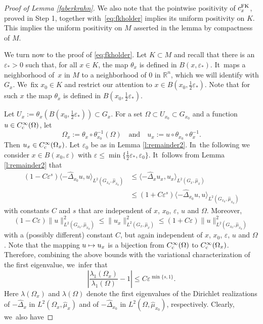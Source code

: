 \documentclass[10pt]{amsart}
\newcommand\mto{\mathchoice{\longmapsto}{\mapsto}{\mapsto}{\mapsto}}
\newcommand{\rc}{\textup{c}}
\newcommand{\FK}{\textup{FK}}
\theoremstyle{definition}
\let\epsilon\varepsilon
\newcommand{\1}{\mathbbm{1}}
\newcommand{\R}{\mathbb{R}}
\begin{document}
\begin{proof}[Proof of Lemma \ref{faberkrahn}]
We also note that the pointwise positivity of $c^\FK_x$, proved in Step 1, together with~\eqref{eq:fkholder} implies its uniform positivity on $K$. This implies the uniform positivity on $M$ asserted in the lemma by compactness of $M$.

We turn now to the proof of \eqref{eq:fkholder}. Let $K\subset M$ and recall that there is an $\epsilon_*>0$ such that, for all $x\in K$, the map $\theta_x$ is defined in $B(x,\epsilon_*)$. It~maps a neighborhood of~$x$ in $M$ to a neighborhood of $0$ in $\R^n$, which we will identify with $G_x$. We~fix $x_0\in K$ and restrict our attention to $x\in B(x_0,\frac12\epsilon_*)$. Note that for such $x$ the map $\theta_x$ is defined in $B(x_0,\frac12\epsilon_*)$.

Let $U_x :=\theta_{x}(B(x_0,\frac12\epsilon_*))\subset G_x$. For a set $\Omega\subset U_{x_0}\subset G_{x_0}$ and a function $u\in C^\infty_\rc(\Omega)$, let
\[
\Omega_x:= \theta_x\circ \theta_{x_0}^{-1}(\Omega)
\quad\text{and}\quad
u_x := u \circ \theta_{x_0} \circ \theta_x^{-1}.
\]
Then $u_x\in C^\infty_\rc(\Omega_x)$. Let $\epsilon_0$ be as in Lemma \ref{l:remainder2}. In~the following we consider $x\in B(x_0,\epsilon)$ with $\epsilon\leq\min\{\frac12\epsilon_*,\epsilon_0\}$. It~follows from Lemma \ref{l:remainder2} that
\begin{align*}
(1-C \epsilon^s) \langle -\widehat\Delta_{x_0} u, u \rangle_{L^2(G_{x_0},\widehat\mu_{x_0})} & \leq
\langle -\widehat\Delta_{x} u_x, u_x \rangle_{L^2(G_{x},\widehat\mu_{x})} \\
& \leq (1+C \epsilon^s) \langle -\widehat\Delta_{x_0} u, u \rangle_{L^2(G_{x_0},\widehat\mu_{x_0})}
\end{align*}
with constants $C$ and $s$ that are independent of $x$, $x_0$, $\epsilon$, $u$ and $\Omega$. Moreover,
\[
(1-C \epsilon) \| u \|_{L^2(G_{x_0},\widehat\mu_{x_0})}^2 \leq
\| u_x \|_{L^2(G_{x},\widehat\mu_{x})}^2
\leq (1+C \epsilon) \| u \|_{L^2(G_{x_0},\widehat\mu_{x_0})}^2
\]
with a (possibly different) constant $C$, but again independent of $x$, $x_0$, $\epsilon$, $u$ and $\Omega$. Note that the mapping $u\mto u_x$ is a bijection from $C^\infty_\rc(\Omega)$ to $C^\infty_\rc(\Omega_x)$. Therefore, combining the above bounds with the variational characterization of the first eigenvalue, we~infer that
\begin{equation}
\label{eq:fkcontproof1}
\left| \frac{\lambda_1(\Omega_x)}{\lambda_1(\Omega)} - 1\right| \leq C \epsilon^{\min\{s,1\}}.
\end{equation}
Here $\lambda(\Omega_x)$ and $\lambda(\Omega)$ denote the first eigenvalues of the Dirichlet realizations of $-\widehat\Delta_x$ in $L^2(\Omega_x,\widehat\mu_x)$ and of $-\widehat\Delta_{x_0}$ in $L^2(\Omega,\widehat\mu_{x_0})$, respectively. Clearly, we~also have

\end{proof}
\end{document}

